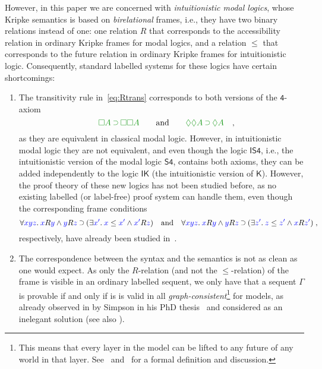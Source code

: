 \documentclass[a4paper]{article}
\theoremstyle{plain}
\theoremstyle{definition}
\newcommand*{\IK}{\mathsf{IK}}
\newcommand*{\K}{\mathsf{K}}
\newcommand*{\ISfour}{\mathsf{IS4}}
\newcommand*{\Sfour}{\mathsf{S4}}
\newcommand{\fourax}{\mathsf{4}}
\newcommand*{\AND}{\mathbin{\wedge}}
\newcommand*{\IMP}{\mathbin{\scalebox{.9}{\raise.2ex\hbox{$\supset$}}}}
\newcommand*{\BOX}{\mathord{\Box}}
\newcommand*{\DIA}{\mathord{\Diamond}}
\newcommand*{\fm}[1]{{\color{notgreen}{#1}}}
\newcommand*{\lb}[1]{{\color{blue}{#1}}}
\newcommand*{\accs}[2]{\lb{#1}R\lb{#2}}
\newcommand*{\futs}[2]{\lb{#1}\le{\color{blue}{#2}}}
\newcommand{\quand}{\quad\mbox{and}\quad}
\newcommand{\qquand}{\qquad\mbox{and}\qquad}
\newcommand{\quadcm}{\rlap{\quad,}}
\begin{document}
However,
in this paper we are concerned with \emph{intuitionistic modal
  logics}, whose Kripke semantics is based on \emph{birelational}
frames, i.e., they have two binary relations instead of one: one
relation $R$ that corresponds to the accessibility relation in
ordinary Kripke frames for modal logics, and a relation $\le$ that
corresponds to the future relation in ordinary Kripke frames for
intuitionistic logic. Consequently, standard labelled systems for
these logics have certain shortcomings:
\begin{enumerate}
\item The transitivity rule in~\eqref{eq:Rtrans} corresponds to both
  versions of the $\fourax$-axiom
  \begin{equation}
    \label{eq:4ax}
    \fm{\BOX A\IMP \BOX\BOX A}
    \qquand
    \fm{\DIA\DIA A\IMP\DIA A}
    \quadcm
  \end{equation}
  as they are equivalent in classical
  modal logic. However, in intuitionistic modal logic they are not
  equivalent, and even though the logic $\ISfour$, i.e., the
  intuitionistic version of the modal logic $\Sfour$, contains both
  axioms, they can be added independently to the logic $\IK$ (the
  intuitionistic version of $\K$). However, the proof theory of these
  new logics has not been studied before, as no existing labelled (or
  label-free) proof system can handle them, even though the
  corresponding frame conditions
  \begin{equation}
    \label{eq:4frame}
    \forall\lb{xyz}.\:\accs xy\AND \accs yz\IMP(\exists\lb{x'}.\:\futs x{x'}\AND\accs {x'}z)
    \quand
    \forall\lb{xyz}.\:\accs xy\AND \accs yz\IMP(\exists\lb{z'}.\:\futs z{z'}\AND\accs {x}{z'})
    \;,
  \end{equation}
  respectively, have already been studied
  in~\cite{plotkin:stirling:86}.
  \item The correspondence between the syntax and the semantics is not
  as clean as one would expect. As only the $R$-relation (and not the
  $\le$-relation) of the frame is visible in an ordinary labelled
  sequent, we only have that a sequent $\Gamma$ is provable if and
  only if is is valid in all \emph{graph-consistent}\footnote{This
    means that every layer in the model can be lifted to any future of
    any world in that layer. See~\cite{simpson:phd} and~\cite{mar:str:tableaux17} for a formal definition and discussion.} for  models, as
  already observed in by Simpson in his PhD thesis~\cite{simpson:phd}
  and considered as an inelegant solution (see also \cite{mar:str:tableaux17}).
\end{enumerate}
\end{document}
